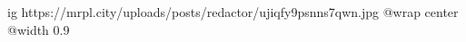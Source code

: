  
 
 
 
 

\ifcmt
  ig https://mrpl.city/uploads/posts/redactor/ujiqfy9psnns7qwn.jpg
  @wrap center
  @width 0.9
\fi
